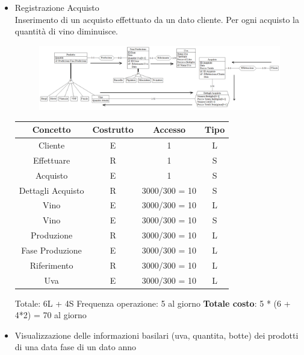 \documentclass{article}
\begin{document}
\begin{itemize}
\item Registrazione Acquisto\\
\newline
Inserimento di un acquisto effettuato da un dato cliente. Per ogni acquisto la quantità di vino diminuisce.\\
\newline
\begin{figure}[htbp]
\centering
\includegraphics[width=1\textwidth]{img/vendite_accessi.png}
\end{figure}
\newline
\newline
\begin{tabular}{c|c|c|c}\hline
    \textbf{Concetto} & \textbf{Costrutto} &  \textbf{Accesso} & \textbf{Tipo} \\\hline
    Cliente & E & 1 & L\\\hline
    Effettuare & R& 1 & S \\\hline
    Acquisto & E & 1 & S\\\hline
    Dettagli Acquisto &R & 3000/300 = 10 & S\\\hline
    Vino & E & 3000/300 = 10 & L\\\hline
    Vino & E & 3000/300 = 10 & S\\\hline
    Produzione & R& 3000/300 = 10 & L\\\hline
    Fase Produzione & E & 3000/300 = 10& L\\\hline
    Riferimento & R&3000/300 = 10 & L\\\hline
    Uva& E & 3000/300 = 10& L\\\hline
\end{tabular}
\newline
Totale: 6L + 4S \qquad \qquad Frequenza operazione: 5 al giorno
\newline
\newline
\textbf{Totale costo}: 5 * (6 + 4*2) = 70 al giorno \\
\newpage
\item Visualizzazione delle informazioni basilari (uva, quantita, botte) dei prodotti di una data fase di un dato anno \\

\end{itemize}
\end{document}
